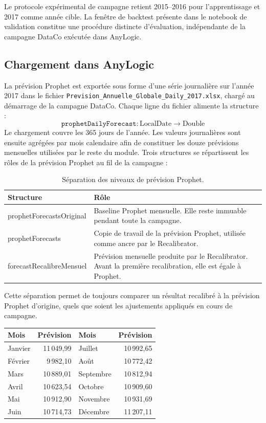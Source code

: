\documentclass[11pt,a4paper]{article}
\newcommand{\code}[1]{\texttt{#1}}
\begin{document}
Le protocole expérimental de campagne retient 2015--2016 pour l'apprentissage et 2017 comme année cible. La fenêtre de backtest présente dans le notebook de validation constitue une procédure distincte d'évaluation, indépendante de la campagne DataCo exécutée dans AnyLogic.

\subsection{Chargement dans AnyLogic}

La prévision Prophet est exportée sous forme d'une série journalière sur l'année 2017 dans le fichier \code{Prevision\_Annuelle\_\allowbreak Globale\_Daily\_2017.xlsx}, chargé au démarrage de la campagne DataCo. Chaque ligne du fichier alimente la structure :
\[
\texttt{prophetDailyForecast} : \mathrm{LocalDate} \rightarrow \mathrm{Double}
\]
Le chargement couvre les 365 jours de l'année. Les valeurs journalières sont ensuite agrégées par mois calendaire afin de constituer les douze prévisions mensuelles utilisées par le reste du module. Trois structures se répartissent les rôles de la prévision Prophet au fil de la campagne :

\begin{table}[htbp]
\centering
\begin{tabularx}{\textwidth}{>{\ttfamily}l X}
\toprule
Structure & Rôle \\
\midrule
prophetForecastsOriginal & Baseline Prophet mensuelle. Elle reste immuable pendant toute la campagne. \\
prophetForecasts & Copie de travail de la prévision Prophet, utilisée comme ancre par le Recalibrator. \\
forecastRecalibreMensuel & Prévision mensuelle produite par le Recalibrator. Avant la première recalibration, elle est égale à Prophet. \\
\bottomrule
\end{tabularx}
\caption{Séparation des niveaux de prévision Prophet.}
\end{table}

Cette séparation permet de toujours comparer un résultat recalibré à la prévision Prophet d'origine, quels que soient les ajustements appliqués en cours de campagne.

\begin{center}
\small
\begin{tabular}{l r@{\qquad}l r}
\toprule
Mois & Prévision & Mois & Prévision \\
\midrule
Janvier & 11\,049,99 & Juillet & 10\,992,65 \\
Février & 9\,982,10 & Août & 10\,772,42 \\
Mars & 10\,889,01 & Septembre & 10\,812,94 \\
Avril & 10\,623,54 & Octobre & 10\,909,60 \\
Mai & 10\,912,90 & Novembre & 10\,931,69 \\
Juin & 10\,714,73 & Décembre & 11\,207,11 \\
\bottomrule
\end{tabular}
\end{center}
\end{document}
